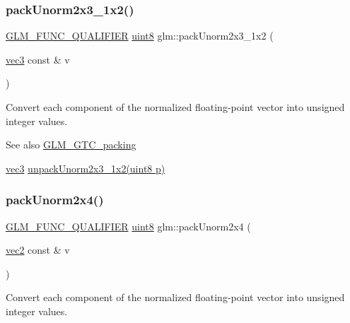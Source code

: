 \subsubsection{\texorpdfstring{pack\+Unorm2x3\+\_\+1x2()}{packUnorm2x3\_1x2()}}
{\footnotesize\ttfamily \hyperlink{setup_8hpp_a33fdea6f91c5f834105f7415e2a64407}{G\+L\+M\+\_\+\+F\+U\+N\+C\+\_\+\+Q\+U\+A\+L\+I\+F\+I\+ER} \hyperlink{group__gtc__type__precision_ga1a7dcd8aac97cc8020817c94049deff2}{uint8} glm\+::pack\+Unorm2x3\+\_\+1x2 (\begin{DoxyParamCaption}\item[{\hyperlink{group__core__types_ga1c47e8b3386109bc992b6c48e91b0be7}{vec3} const \&}]{v }\end{DoxyParamCaption})}

Convert each component of the normalized floating-\/point vector into unsigned integer values.

\begin{DoxySeeAlso}{See also}
\hyperlink{group__gtc__packing}{G\+L\+M\+\_\+\+G\+T\+C\+\_\+packing} 

\hyperlink{group__core__types_ga1c47e8b3386109bc992b6c48e91b0be7}{vec3} \hyperlink{group__gtc__packing_gaeeacc5275329100c50fe8fc0871eb423}{unpack\+Unorm2x3\+\_\+1x2(uint8 p)} 
\end{DoxySeeAlso}
\mbox{\label{group__gtc__packing_gad68eb2f848ba867192b8787998c0595a}} 
\subsubsection{\texorpdfstring{pack\+Unorm2x4()}{packUnorm2x4()}}
{\footnotesize\ttfamily \hyperlink{setup_8hpp_a33fdea6f91c5f834105f7415e2a64407}{G\+L\+M\+\_\+\+F\+U\+N\+C\+\_\+\+Q\+U\+A\+L\+I\+F\+I\+ER} \hyperlink{group__gtc__type__precision_ga1a7dcd8aac97cc8020817c94049deff2}{uint8} glm\+::pack\+Unorm2x4 (\begin{DoxyParamCaption}\item[{\hyperlink{group__core__types_gaa1618f51db67eaa145db101d8c8431d8}{vec2} const \&}]{v }\end{DoxyParamCaption})}

Convert each component of the normalized floating-\/point vector into unsigned integer values.

